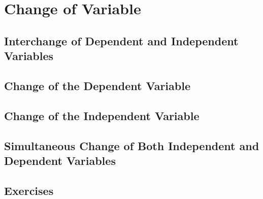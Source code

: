 \chapter{Change of Variable}
\label{ch:11}

\section{Interchange of Dependent and Independent Variables}
\label{sec:11:01}

\section{Change of the Dependent Variable}
\label{sec:11:02}

\section{Change of the Independent Variable}
\label{sec:11:03}

\section[Simultaneous Change of Independent and Dependent Variables]{Simultaneous Change of Both Independent and Dependent Variables}
\label{sec:11:04}

\section{Exercises}
\label{sec:11:05}

